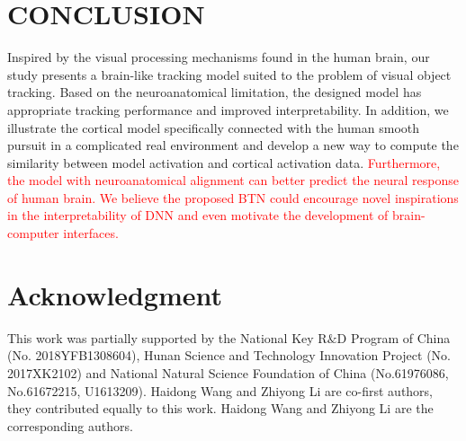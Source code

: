 \documentclass[journal]{IEEEtran}
\begin{document}
\section{CONCLUSION}
Inspired by the visual processing mechanisms found in the human brain, our study presents a brain-like tracking model suited to the problem of visual object tracking. 
Based on the neuroanatomical limitation, the designed model has appropriate tracking performance and improved interpretability. 
In addition, we illustrate the cortical model specifically connected with the human smooth pursuit in a complicated real environment 
and develop a new way to compute the similarity between model activation and cortical activation data. 
\textcolor{red}{
	Furthermore, the model with neuroanatomical alignment can better predict the neural response of human brain. 
	We believe the proposed BTN could encourage novel inspirations in the interpretability of DNN 
	and even motivate the development of brain-computer interfaces.}


%


\section*{Acknowledgment}
This work was partially supported by the National Key R$\&$D Program of China (No. 2018YFB1308604), Hunan Science and Technology Innovation Project (No. 2017XK2102) and National Natural Science Foundation of China (No.61976086, No.61672215, U1613209). Haidong Wang and Zhiyong Li are co-first authors, they contributed equally to this work. Haidong Wang and Zhiyong Li are the corresponding authors. 
\end{document}
